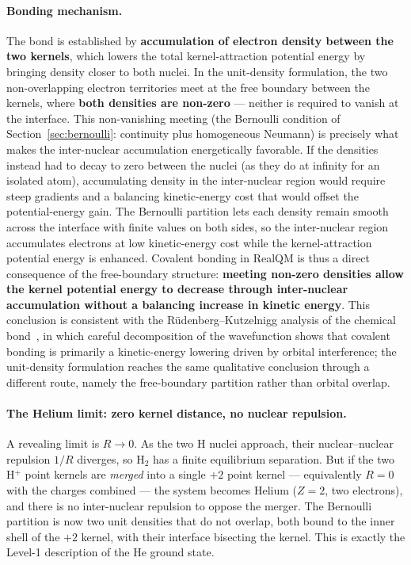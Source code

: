 \documentclass[11pt]{article}
\begin{document}
\paragraph{Bonding mechanism.}
The bond is established by \textbf{accumulation of electron density between the two kernels}, which lowers the total kernel-attraction potential energy by bringing density closer to both nuclei. In the unit-density formulation, the two non-overlapping electron territories meet at the free boundary between the kernels, where \textbf{both densities are non-zero} --- neither is required to vanish at the interface. This non-vanishing meeting (the Bernoulli condition of Section~\ref{sec:bernoulli}: continuity plus homogeneous Neumann) is precisely what makes the inter-nuclear accumulation energetically favorable. If the densities instead had to decay to zero between the nuclei (as they do at infinity for an isolated atom), accumulating density in the inter-nuclear region would require steep gradients and a balancing kinetic-energy cost that would offset the potential-energy gain. The Bernoulli partition lets each density remain smooth across the interface with finite values on both sides, so the inter-nuclear region accumulates electrons at low kinetic-energy cost while the kernel-attraction potential energy is enhanced. Covalent bonding in RealQM is thus a direct consequence of the free-boundary structure: \textbf{meeting non-zero densities allow the kernel potential energy to decrease through inter-nuclear accumulation without a balancing increase in kinetic energy}. This conclusion is consistent with the R\"udenberg--Kutzelnigg analysis of the chemical bond~\cite{Ruedenberg62, Kutzelnigg90}, in which careful decomposition of the wavefunction shows that covalent bonding is primarily a kinetic-energy lowering driven by orbital interference; the unit-density formulation reaches the same qualitative conclusion through a different route, namely the free-boundary partition rather than orbital overlap.

\paragraph{The Helium limit: zero kernel distance, no nuclear repulsion.}
A revealing limit is $R \to 0$. As the two H nuclei approach, their nuclear--nuclear repulsion $1/R$ diverges, so H$_2$ has a finite equilibrium separation. But if the two H$^+$ point kernels are \emph{merged} into a single $+2$ point kernel --- equivalently $R = 0$ with the charges combined --- the system becomes Helium ($Z = 2$, two electrons), and there is no inter-nuclear repulsion to oppose the merger. The Bernoulli partition is now two unit densities that do not overlap, both bound to the inner shell of the $+2$ kernel, with their interface bisecting the kernel. This is exactly the Level-1 description of the He ground state.
\end{document}
